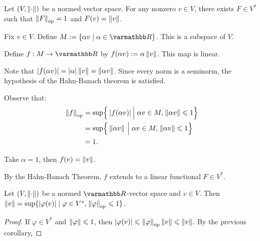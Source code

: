 \documentclass[10pt,oneside,openany]{memoir}
\begin{document}
\begin{corollary}
    Let $(V,\lnorm \cdot \rnorm)$ be a normed vector space. For any nonzero $v \in V$, there exists $F \in V^\ast$ such that $\lnorm F \rnorm_{\op} = 1$ and $F(v) = \lnorm v \rnorm$.
\end{corollary}
    \begin{sproof}
        Fix $v \in V$. Define $M := \{\alpha v \mid \alpha \in \bfR\}$. This is a subspace of $V$.\nl
        
        \noindent Define $f:M \rightarrow \bfR$ by $f(\alpha v) := \alpha \lnorm v \rnorm$. This map is linear. \nl
        
        \noindent Note that $|f(\alpha v)| = |\alpha| \lnorm v \rnorm = \lnorm \alpha v \rnorm$. Since every norm is a seminorm, the hypothesis of the Hahn-Banach theorem is satisfied.   \nl
         
        \noindent Observe that:
            \begin{equation*}
            \begin{split}
                \lnorm f \rnorm_{\op}
                & = \sup \Bigl\{\h2|f(\alpha v)| \h2\Big|\h3 \alpha v \in M, \h1 \lnorm \alpha v \rnorm \leq 1\Bigr\} \\
                & = \sup \Bigl\{\h2\lnorm \alpha v \rnorm \h2\Big|\h3 \alpha v \in M, \h1 \lnorm \alpha v \rnorm \leq 1\Bigr\} \\
                & = 1.
            \end{split}
            \end{equation*}

        \noindent Take $\alpha = 1$, then $f(v) = \lnorm v \rnorm$. \nl
        
        \noindent By the Hahn-Banach Theorem, $f$ extends to a linear functional $F \in V^\ast$. \qedhere
    \end{sproof}

\begin{corollary}
    Let $(V,\lnorm \cdot \rnorm)$ be a normed $\bfR$-vector space and $v \in V$. Then $\lnorm v \rnorm = \sup\{|\varphi(v)| \mid \varphi \in V^\ast, \h1 \lnorm \varphi \rnorm_{\op} \leq 1\}$.
\end{corollary}
    \begin{proof}
        If $\varphi \in V^\ast$ and $\lnorm \varphi \rnorm \leq 1$, then $|\varphi(v)| \leq \lnorm \varphi \rnorm_{\op}\lnorm v \rnorm \leq \lnorm v \rnorm$. By the previous corollary, 
    \end{proof}
\end{document}
